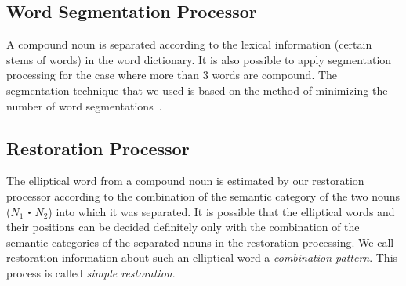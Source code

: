 \subsection{Word Segmentation Processor}
 A\hspace{-0.1mm} compound\hspace{-0.1mm} noun\hspace{-0.1mm} is\hspace{-0.1mm} separated\hspace{-0.1mm} according\hspace{-0.1mm} to\hspace{-0.1mm} the\hspace{-0.1mm} lexical\hspace{-0.1mm} information\hspace{-0.1mm}
(certain\hspace{-0.1mm} stems\hspace{-0.1mm} of\hspace{-0.1mm} words) in the word dictionary. It is also possible
to apply segmentation processing for the case where more than 3 words
are compound. The segmentation technique that we used is based on
the method of minimizing the number of word segmentations~\cite{Yoshimura83}.

\subsection{Restoration Processor}
 The elliptical word from a compound noun is estimated by our
restoration processor according to the combination of the semantic
category of the two nouns ($N_1$・$N_2$) into which it was separated.
It is possible that the elliptical words and their positions can be
decided definitely only with the combination of the semantic
categories of the separated nouns in the restoration processing. We
call restoration information about such an elliptical word a
{\it combination pattern}. This process is called {\it simple
restoration}.

